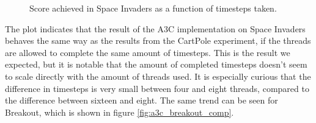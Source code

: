 \documentclass[11pt]{article}
\begin{document}
\begin{figure}[H]
    \caption{Score achieved in Space Invaders as a function of
    timesteps taken.}
    \label{fig:a3c_spaceinvaders_ts}
\end{figure}

The plot indicates that the result of the A3C implementation
on Space Invaders behaves the same way as the results from the CartPole experiment,
if the threads are allowed to complete the same amount of timesteps.
This is the result we expected, but it is notable that the amount
of completed timesteps doesn't seem to scale directly with
the amount of threads used.
It is especially curious that the difference in timesteps is very small
between four and eight threads, compared to the difference between sixteen and eight.
The same trend can be seen for Breakout, which is shown in figure
\ref{fig:a3c_breakout_comp}.
\end{document}
